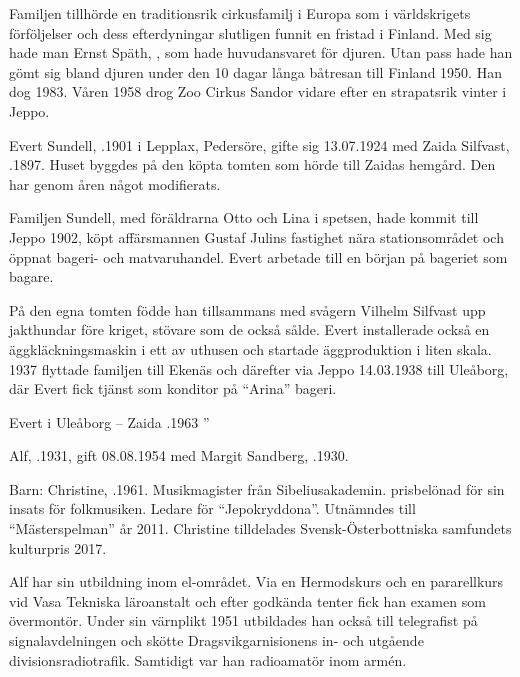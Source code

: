 Familjen tillhörde en traditionsrik cirkusfamilj i Europa som i världskrigets förföljelser och dess efterdyningar slutligen funnit en fristad i Finland. Med sig hade man Ernst Späth, , som hade huvudansvaret för djuren. Utan pass hade han gömt sig bland djuren under den 10 dagar långa båtresan till Finland 1950. Han dog 1983. Våren 1958 drog Zoo Cirkus Sandor vidare efter en strapatsrik vinter i Jeppo.


Evert Sundell, .1901 i Lepplax, Pedersöre, gifte sig 13.07.1924 med Zaida Silfvast, .1897. Huset byggdes på den köpta tomten som hörde till Zaidas hemgård. Den har genom åren något modifierats.

Familjen Sundell, med föräldrarna Otto och Lina i spetsen, hade kommit till Jeppo 1902, köpt affärsmannen Gustaf Julins fastighet nära stationsområdet och öppnat bageri- och matvaruhandel. Evert arbetade till en början på bageriet som bagare.

På den egna tomten födde han tillsammans med svågern Vilhelm Silfvast upp jakthundar före kriget, stövare som de också sålde. Evert installerade också en äggkläckningsmaskin i ett av uthusen och startade äggproduktion i liten skala. 1937 flyttade familjen till Ekenäs och därefter via Jeppo 14.03.1938 till Uleåborg, där Evert fick tjänst som konditor på ``Arina'' bageri.
\begin{jhchildren}
  \item {}
  \item {}
  \item {}
\end{jhchildren}

Evert  i Uleåborg  --  Zaida .1963         ”




Alf, .1931, gift 08.08.1954 med Margit Sandberg, .1930.

Barn: Christine, .1961. Musikmagister från Sibeliusakademin. prisbelönad för sin insats för folkmusiken. Ledare för ``Jepokryddona''. Utnämndes till ``Mästerspelman'' år 2011. Christine tilldelades Svensk-Österbottniska samfundets kulturpris 2017.

Alf har sin utbildning inom el-området. Via en Hermodskurs och en pararellkurs vid Vasa Tekniska läroanstalt och efter godkända tenter fick han examen som övermontör. Under sin värnplikt 1951 utbildades han också till telegrafist på signalavdelningen och skötte Dragsvikgarnisionens in- och utgående divisionsradiotrafik. Samtidigt var han radioamatör inom armén.

